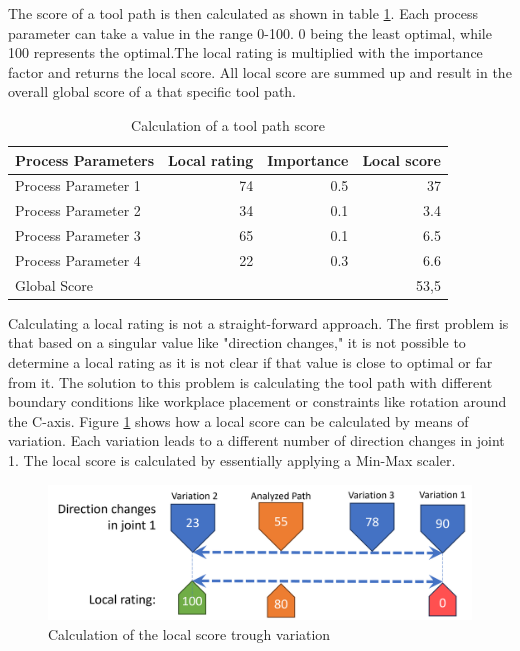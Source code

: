 The score of a tool path is then calculated as shown in table \ref{weighting}. Each process parameter can take a value in the range 0-100. 0 being the least optimal, while 100 represents the optimal.The local rating is multiplied with the importance factor and returns the local score. All local score are summed up and result in the overall global score of a that specific tool path.

\begin{table}[H]
	\centering
	\begin{tabular}{||l|r|r|r||}
		Process Parameters & Local rating & Importance & Local score\\
		\hline
		\hline
		\hline
		
		Process Parameter 1 & 74 & 0.5 & 37\\
		Process Parameter 2 & 34& 0.1&3.4\\
		Process Parameter 3& 65& 0.1&6.5\\
		Process Parameter 4& 22&0.3&6.6\\
		\hline
		\hline
		\hline
		Global Score& & &53,5\\
		\hline
		\hline
	\end{tabular}
	
	\caption{Calculation of a tool path score}
	\label{weighting}
\end{table}

Calculating a local rating is not a straight-forward approach. The first problem is that based on a singular value like "direction changes," it is not possible to determine a local rating as it is not clear if that value is close to optimal or far from it.
The solution to this problem is calculating the tool path with different boundary conditions like workplace placement or constraints like rotation around the C-axis.
Figure \ref{Localscore} shows how a local score can be calculated by means of variation. Each variation leads to a different number of direction changes in joint 1. The local score is calculated by essentially applying a Min-Max scaler.

\begin{figure}[H]
	\centerline{\includegraphics[scale=.65]{figures/localscore.png}}
	\caption{Calculation of the local score trough variation}
	\label{Localscore}
\end{figure}



